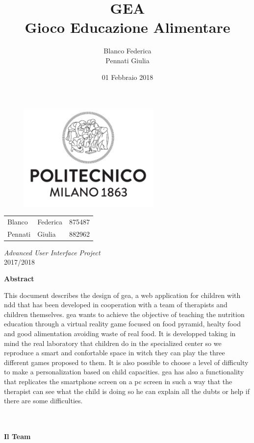 \documentclass[a4paper, 12pt]{article}
\title{\textbf{GEA}\\[3mm]
Gioco Educazione Alimentare}
\author{Blanco Federica\\Pennati Giulia%
}
\date{01 Febbraio 2018} %
\makeatletter
\renewcommand{\maketitle}{ 
\begin{figure}[h]
\centering
\includegraphics[width=7cm]{Images/LogoPolimi}\\[.5cm]
\end{figure}

\vspace{50pt}

\begin{flushright} %
\@date 

{\huge\@title} %
\vspace{140pt} %


\begin{tabular}{ l l c}
\large Blanco &  \large Federica & \large 875487\\
\large Pennati & \large Giulia & \large 882962\\
\end{tabular}

\vspace{40pt} %
\end{flushright}
\centering
\textsl{\large Advanced User Interface Project}\\
2017/2018
}
\makeatother
\begin{document}
\begin{titlepage}

\thispagestyle{empty}
\maketitle %

\end{titlepage}

\clearpage
\begin{center}
\textbf{Abstract}\\
\end{center}
This document describes the design of \acs{gea}, a web application for children with \acl{ndd} that has been developed in cooperation with a team of therapists and children themselves. \acs{gea} wants to achieve the objective of teaching the nutrition education through a virtual reality game focused on food pyramid, healty food and good alimentation avoiding waste of real food. It is developped taking in mind the real laboratory that children do in the specialized center so we reproduce a smart and confortable space in witch they can play the three different games proposed to them. It is also possible to choose a level of difficulty to make a personalization based on child capacities. \acs{gea} has also a functionality that replicates the smartphone screen on a pc screen in such a way that the therapist can see what the child is doing so he can explain all the dubts or help if there are some difficulties. %
\\
\\
\\
\begin{center}
\textbf{Il Team}\\
\end{center}
\vspace{20px}
\end{document}
